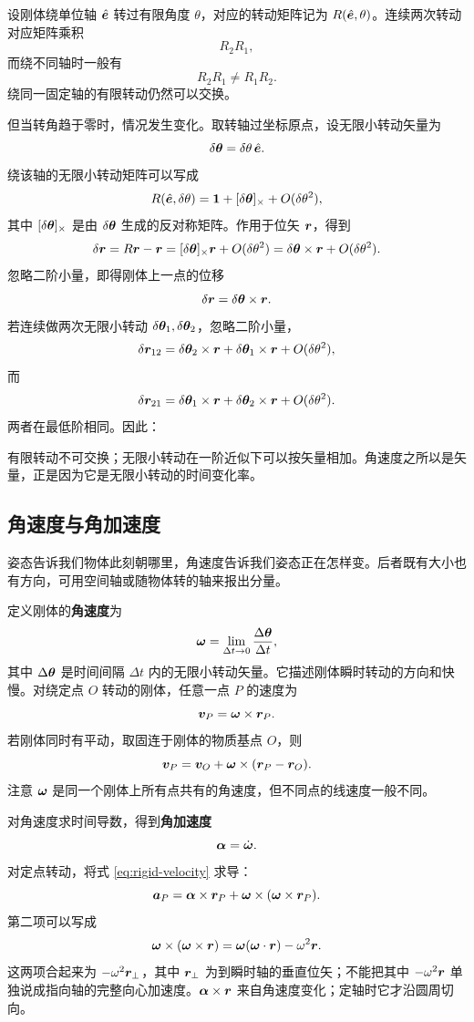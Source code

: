 设刚体绕单位轴 \(\hat{\boldsymbol{e}}\) 转过有限角度 \(\theta\)，对应的转动矩阵记为 \(R(\hat{\boldsymbol{e}},\theta)\)。连续两次转动对应矩阵乘积
\[
R_2R_1,
\]
而绕不同轴时一般有
\[
R_2R_1\ne R_1R_2.
\]
绕同一固定轴的有限转动仍然可以交换。

但当转角趋于零时，情况发生变化。取转轴过坐标原点，设无限小转动矢量为
\[
\delta\boldsymbol{\theta}=\delta\theta\,\hat{\boldsymbol{e}}.
\]
绕该轴的无限小转动矩阵可以写成
\[
R(\hat{\boldsymbol{e}},\delta\theta)
=\mathbf 1+[\delta\boldsymbol{\theta}]_\times+O(\delta\theta^2),
\]
其中 \([\delta\boldsymbol{\theta}]_\times\) 是由 \(\delta\boldsymbol{\theta}\) 生成的反对称矩阵。作用于位矢 \(\boldsymbol{r}\)，得到
\[
\delta\boldsymbol{r}
=R\boldsymbol{r}-\boldsymbol{r}
=[\delta\boldsymbol{\theta}]_\times\boldsymbol{r}+O(\delta\theta^2)
=\delta\boldsymbol{\theta}\times\boldsymbol{r}+O(\delta\theta^2).
\]
忽略二阶小量，即得刚体上一点的位移
\[
\delta\boldsymbol{r}=\delta\boldsymbol{\theta}\times\boldsymbol{r}.
\]
若连续做两次无限小转动 \(\delta\boldsymbol{\theta}_1,\delta\boldsymbol{\theta}_2\)，忽略二阶小量，
\[
\delta\boldsymbol{r}_{12}
=\delta\boldsymbol{\theta}_2\times\boldsymbol{r}+\delta\boldsymbol{\theta}_1\times\boldsymbol{r}
+O(\delta\theta^2),
\]
而
\[
\delta\boldsymbol{r}_{21}
=\delta\boldsymbol{\theta}_1\times\boldsymbol{r}+\delta\boldsymbol{\theta}_2\times\boldsymbol{r}
+O(\delta\theta^2).
\]
两者在最低阶相同。因此：

\begin{keybox}
有限转动不可交换；无限小转动在一阶近似下可以按矢量相加。角速度之所以是矢量，正是因为它是无限小转动的时间变化率。
\end{keybox}

\subsection{角速度与角加速度}

姿态告诉我们物体此刻朝哪里，角速度告诉我们姿态正在怎样变。后者既有大小也有方向，可用空间轴或随物体转的轴来报出分量。

定义刚体的\textbf{角速度}为
\[
\boldsymbol{\omega}=\lim_{\Delta t\to0}\frac{\Delta\boldsymbol{\theta}}{\Delta t},
\]
其中 \(\Delta\boldsymbol{\theta}\) 是时间间隔 \(\Delta t\) 内的无限小转动矢量。它描述刚体瞬时转动的方向和快慢。对绕定点 \(O\) 转动的刚体，任意一点 \(P\) 的速度为
\begin{equation}
\boldsymbol{v}_P=\boldsymbol{\omega}\times\boldsymbol{r}_P.
\label{eq:rigid-velocity}
\end{equation}
若刚体同时有平动，取固连于刚体的物质基点 \(O\)，则
\begin{equation}
\boldsymbol{v}_P=\boldsymbol{v}_O+\boldsymbol{\omega}\times(\boldsymbol{r}_P-\boldsymbol{r}_O).
\label{eq:rigid-velocity-general}
\end{equation}
注意 \(\boldsymbol{\omega}\) 是同一个刚体上所有点共有的角速度，但不同点的线速度一般不同。

对角速度求时间导数，得到\textbf{角加速度}
\[
\boldsymbol\alpha=\dot{\boldsymbol{\omega}}.
\]
对定点转动，将式 \eqref{eq:rigid-velocity} 求导：
\begin{equation}
\boldsymbol{a}_P
=\boldsymbol\alpha\times\boldsymbol{r}_P
+\boldsymbol{\omega}\times(\boldsymbol{\omega}\times\boldsymbol{r}_P).
\label{eq:rigid-acceleration}
\end{equation}
第二项可以写成
\[
\boldsymbol{\omega}\times(\boldsymbol{\omega}\times\boldsymbol{r})
=\boldsymbol{\omega}(\boldsymbol{\omega}\cdot\boldsymbol{r})-\omega^2\boldsymbol{r}.
\]
这两项合起来为 $-\omega^2\boldsymbol{r}_\perp$，其中 $\boldsymbol{r}_\perp$ 为到瞬时轴的垂直位矢；不能把其中 $-\omega^2\boldsymbol{r}$ 单独说成指向轴的完整向心加速度。$\boldsymbol\alpha\times\boldsymbol{r}$ 来自角速度变化；定轴时它才沿圆周切向。

